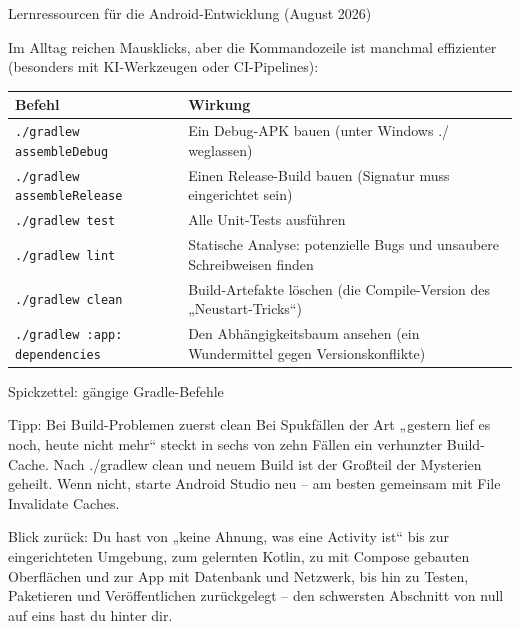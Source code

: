 \begin{center}\small\color{gray}Lernressourcen für die Android-Entwicklung (August 2026)\end{center}


Im Alltag reichen Mausklicks, aber die Kommandozeile ist manchmal effizienter (besonders mit KI-Werkzeugen oder CI-Pipelines):

\begin{center}
\begin{tabularx}{\linewidth}{|X|X|}
\hline
\textbf{Befehl} & \textbf{Wirkung} \tabularnewline
\hline
\texttt{.\allowbreak /\allowbreak gradlew assembleDebug} & Ein Debug-APK bauen (unter Windows ./ weglassen) \tabularnewline
\texttt{.\allowbreak /\allowbreak gradlew assembleRelease} & Einen Release-Build bauen (Signatur muss eingerichtet sein) \tabularnewline
\texttt{.\allowbreak /\allowbreak gradlew test} & Alle Unit-Tests ausführen \tabularnewline
\texttt{.\allowbreak /\allowbreak gradlew lint} & Statische Analyse: potenzielle Bugs und unsaubere Schreibweisen finden \tabularnewline
\texttt{.\allowbreak /\allowbreak gradlew clean} & Build-Artefakte löschen (die Compile-Version des „Neustart-Tricks“) \tabularnewline
\texttt{.\allowbreak /\allowbreak gradlew :app: dependencies} & Den Abhängigkeitsbaum ansehen (ein Wundermittel gegen Versionskonflikte) \tabularnewline
\hline
\end{tabularx}
\end{center}

\begin{center}\small\color{gray}Spickzettel: gängige Gradle-Befehle\end{center}

\begin{tcbinfo}{Tipp: Bei Build-Problemen zuerst clean}
Bei Spukfällen der Art „gestern lief es noch, heute nicht mehr“ steckt in sechs von zehn Fällen ein verhunzter Build-Cache. Nach ./gradlew clean und neuem Build ist der Großteil der Mysterien geheilt. Wenn nicht, starte Android Studio neu – am besten gemeinsam mit File Invalidate Caches.

\end{tcbinfo}



Blick zurück: Du hast von „keine Ahnung, was eine Activity ist“ bis zur eingerichteten Umgebung, zum gelernten Kotlin, zu mit Compose gebauten Oberflächen und zur App mit Datenbank und Netzwerk, bis hin zu Testen, Paketieren und Veröffentlichen zurückgelegt – den schwersten Abschnitt von null auf eins hast du hinter dir.

